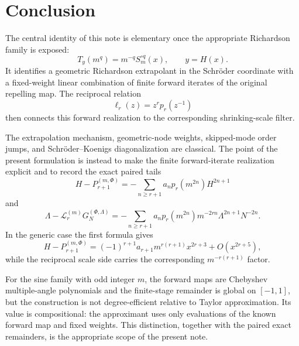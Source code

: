 \documentclass[11pt]{article}
\theoremstyle{remark}
\newcommand{\Lop}{\mathcal L}
\begin{document}
\section{Conclusion}

The central identity of this note is elementary once the appropriate
Richardson family is exposed:
\[
T_y(m^q)
=
m^{-q}S_m^{\circ q}(x),
\qquad y=H(x).
\]
It identifies a geometric Richardson extrapolant in the Schr\"oder
coordinate with a fixed-weight linear combination of finite forward
iterates of the original repelling map.  The reciprocal relation
\[
\ell_r(z)=z^rp_r(z^{-1})
\]
then connects this forward realization to the corresponding shrinking-scale
filter.

The extrapolation mechanism, geometric-node weights, skipped-mode order
jumps, and Schr\"oder--Koenigs diagonalization are classical.  The point of
the present formulation is instead to make the finite forward-iterate
realization explicit and to record the exact paired tails
\[
H-P_{r+1}^{(m,\Phi)}
=
-\sum_{n\ge r+1}a_np_r(m^{2n})H^{2n+1}
\]
and
\[
\Lambda-\Lop_r^{(m)}G_N^{(\Phi,\Lambda)}
=
-\sum_{n\ge r+1}
a_np_r(m^{2n})m^{-2rn}\Lambda^{2n+1}N^{-2n}.
\]
In the generic case the first formula gives
\[
H-P_{r+1}^{(m,\Phi)}
=
(-1)^{r+1}a_{r+1}m^{r(r+1)}x^{2r+3}
+O(x^{2r+5}),
\]
while the reciprocal scale side carries the corresponding
\(m^{-r(r+1)}\) factor.

For the sine family with odd integer \(m\), the forward maps are
Chebyshev multiple-angle polynomials and the finite-stage remainder is global
on \([-1,1]\), but
the construction is not degree-efficient relative to Taylor approximation.
Its value is compositional: the approximant uses only evaluations of the
known forward map and fixed weights.  This distinction, together with the
paired exact remainders, is the appropriate scope of the present note.
\end{document}

